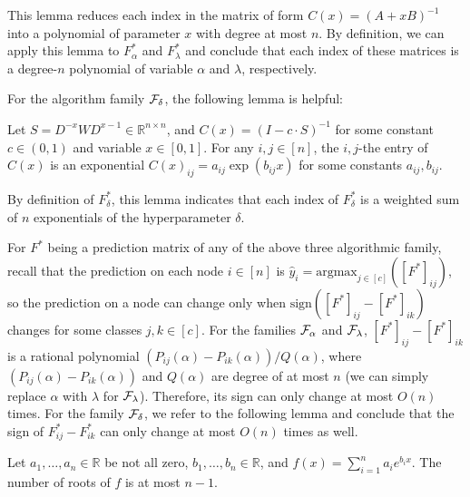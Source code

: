 \noindent This lemma reduces each index in the matrix of form $C(x) = (A+xB)^{-1}$ into a polynomial of parameter $x$ with degree at most $n$. By definition, we can apply this lemma to $F^*_\alpha$ and $F^*_\lambda$ and conclude that each index of these matrices is a degree-$n$ polynomial of variable $\alpha$ and $\lambda$, respectively. 

For the algorithm family $\mathcal{F}_\delta$, the following lemma is helpful:

\begin{lemma}\label{lem: delta F form}
    Let $S = D^{-x} W D^{x-1} \in \mathbb{R}^{n \times n}$, and $C(x) = (I - c \cdot S)^{-1}$ for some constant $c \in (0,1)$ and variable $x \in [0,1]$. For any $i,j \in [n]$, the $i,j$-the entry of $C(x)$ is an exponential
    $C(x)_{ij} = a_{ij} \exp(b_{ij}x)$
    for some constants $a_{ij}, b_{ij}$.
\end{lemma}

\noindent By definition of $F^*_\delta$, this lemma indicates that each index of $F^*_\delta$ is a weighted sum of $n$ exponentials of the hyperparameter $\delta$. 


For $F^*$ being a prediction matrix of any of the above three algorithmic family, recall that the prediction on each node $i \in [n]$ is $\hat y_i = \text{argmax}_{j \in [c]}([F^*]_{ij})$, so the prediction on a node can change only when $\text{sign}([F^*]_{ij} - [F^*]_{ik})$ changes for some classes $j,k \in [c]$. For the families $\mathcal{F}_\alpha$ and $\mathcal{F}_\lambda$, $[F^*]_{ij} - [F^*]_{ik}$ is a rational polynomial $(P_{ij}(\alpha) - P_{ik}(\alpha)) / Q(\alpha)$, where $(P_{ij}(\alpha) - P_{ik}(\alpha))$ and $Q(\alpha)$ are degree of at most $n$ (we can simply replace $\alpha$ with $\lambda$ for $\mathcal{F}_\lambda$). Therefore, its sign can only change at most $O(n)$ times. For the family $\mathcal{F}_\delta$, we refer to the following lemma and conclude that the sign of $F^*_{ij}-F^*_{ik}$ can only change at most $O(n)$ times as well.
\begin{lemma} \label{lem:roots of exp sum}
    Let $a_1, \ldots, a_n \in \mathbb{R}$ be not all zero, $b_1, \ldots, b_n \in \mathbb{R}$, and $f(x) = \sum_{i=1}^n a_i e^{b_i x}$. The number of roots of $f$ is at most $n-1$.
\end{lemma}

